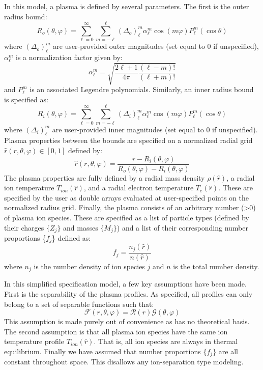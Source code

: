	In this model, a plasma is defined by several parameters. The first is the outer radius bound:
	\begin{equation}
		R_o(\theta, \varphi) = \sum_{\ell=0}^{\infty} \sum_{m=-\ell}^{\ell} \left(\Delta_{o}\right)_\ell^{m} \alpha_{\ell}^{m} \cos(m\varphi) P_{\ell}^{m}(\cos\theta)
		\label{eq:outerR}
	\end{equation}
	where $\left(\Delta_{o}\right)_\ell^{m}$ are user-provided outer magnitudes (set equal to 0 if unspecified), $\alpha_{\ell}^{m}$ is a normalization factor given by:
	\begin{equation}
		\alpha_{\ell}^{m} = \sqrt{\frac{2\ell+1}{4\pi}\frac{(\ell - m)!}{(\ell+m)!}}
	\end{equation}
	and $P_{\ell}^{m}$ is an associated Legendre polynomials. Similarly, an inner radius bound is specified as:
	\begin{equation}
		R_i(\theta, \varphi) = \sum_{\ell=0}^{\infty} \sum_{m=-\ell}^{\ell} \left(\Delta_{i}\right)_\ell^{m} \alpha_{\ell}^{m} \cos(m\varphi) P_{\ell}^{m}(\cos\theta)
		\label{eq:innerR}
	\end{equation}
	where $\left(\Delta_{i}\right)_\ell^{m}$ are user-provided inner magnitudes (set equal to 0 if unspecified). Plasma properties between the bounds are specified on a normalized radial grid $\hat{r}(r,\theta,\varphi)\in [0,1]$ defined by:
	\begin{equation}
		\hat{r}(r,\theta,\varphi) = \frac{r-R_{i}(\theta,\varphi)}{R_{o}(\theta,\varphi)-R_{i}(\theta,\varphi)}
	\end{equation}
	The plasma properties are fully defined by a radial mass density $\rho(\hat{r})$, a radial ion temperature $T_{ion}(\hat{r})$, and a radial electron temperature $T_e(\hat{r})$. These are specified by the user as double arrays evaluated at user-specified points on the normalized radius grid. Finally, the plasma consists of an arbitrary number (>0) of plasma ion species. These are specified as a list of particle types (defined by their charges $\{Z_j\}$ and masses $\{M_j\}$) and a list of their corresponding number proportions \{$f_j$\} defined as:
	\begin{equation}
		f_j = \frac{n_j(\hat{r})}{n(\hat{r})}
	\end{equation}
	where $n_j$ is the number density of ion species $j$ and $n$ is the total number density.
	
	In this simplified specification model, a few key assumptions have been made. First is the separability of the plasma profiles. As specified, all profiles can only belong to a set of separable functions such that:
	\begin{equation}
		\mathcal{F}(r, \theta, \varphi) = \mathcal{R}(r) \mathcal{G}(\theta, \varphi)
	\end{equation}
	This assumption is made purely out of convenience as has no theoretical basis. The second assumption is that all plasma ion species have the same ion temperature profile $T_{ion}(\hat{r})$. That is, all ion species are always in thermal equilibrium. Finally we have assumed that number proportions $\{f_j\}$ are all constant throughout space. This disallows any ion-separation type modeling.
	
